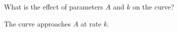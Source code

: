 What is the effect of parameters $A$ and $k$ on the curve?

\begin{solution}
    The curve approaches $A$ at rate $k$.
\end{solution}